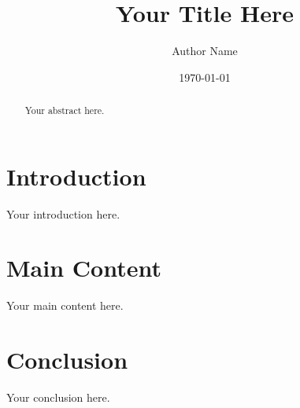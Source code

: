 \documentclass[12pt]{article}
\title{Your Title Here}
\author{Author Name}
\date{\today}
\begin{document}
\maketitle

\begin{abstract}
Your abstract here.
\end{abstract}

\section{Introduction}
Your introduction here.

\section{Main Content}
Your main content here.

\section{Conclusion}
Your conclusion here.
\end{document}
